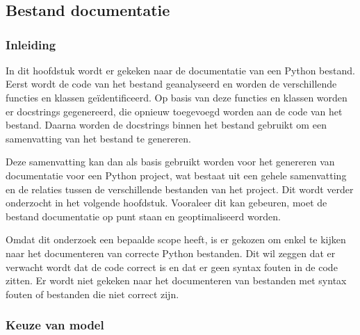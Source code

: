 \chapter{}%
\label{ch:resultaten}

\section{Bestand documentatie}
\label{sec:bestanddocumentatie}

\subsection{Inleiding}
\label{sec:bestanddocumentatie-inleiding}
In dit hoofdstuk wordt er gekeken naar de documentatie van een Python bestand.
Eerst wordt de code van het bestand geanalyseerd en worden de verschillende functies en klassen geïdentificeerd.
Op basis van deze functies en klassen worden er docstrings gegenereerd, die opnieuw toegevoegd worden aan de code van het bestand.
Daarna worden de docstrings binnen het bestand gebruikt om een samenvatting van het bestand te genereren.

Deze samenvatting kan dan als basis gebruikt worden voor het genereren van documentatie voor een Python project, wat bestaat uit een gehele samenvatting en de relaties tussen de verschillende bestanden van het project.
Dit wordt verder onderzocht in het volgende hoofdstuk.
Vooraleer dit kan gebeuren, moet de bestand documentatie op punt staan en geoptimaliseerd worden.

Omdat dit onderzoek een bepaalde scope heeft, is er gekozen om enkel te kijken naar het documenteren van correcte Python bestanden.
Dit wil zeggen dat er verwacht wordt dat de code correct is en dat er geen syntax fouten in de code zitten.
Er wordt niet gekeken naar het documenteren van bestanden met syntax fouten of bestanden die niet correct zijn.

\subsection{Keuze van model}
\label{sec:bestanddocumentatie-model}

